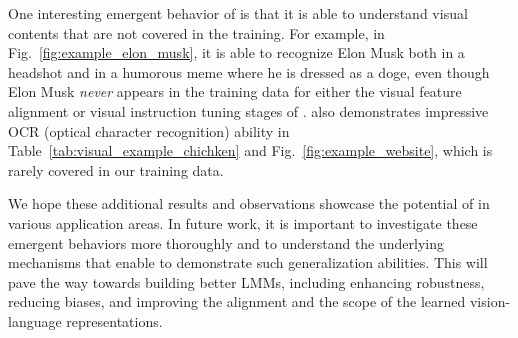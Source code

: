 One interesting emergent behavior of \shortname{} is that it is able to understand visual contents that are not covered in the training.  For example, in Fig.~\ref{fig:example_elon_musk}, it is able to recognize Elon Musk both in a headshot and in a humorous meme where he is dressed as a doge, even though Elon Musk \emph{never} appears in the training data for either the visual feature alignment or visual instruction tuning stages of \shortname{}.  \shortname{} also demonstrates impressive OCR (optical character recognition) ability in Table~\ref{tab:visual_example_chichken} and Fig.~\ref{fig:example_website}, which is rarely covered in our training data.

We hope these additional results and observations showcase the potential of \shortname{} in various application areas. In future work, it is important to investigate these emergent behaviors more thoroughly and to understand the underlying mechanisms that enable \shortname{} to demonstrate such generalization abilities. This will pave the way towards building better LMMs, including enhancing robustness, reducing biases, and improving the alignment and the scope of the learned vision-language representations.

